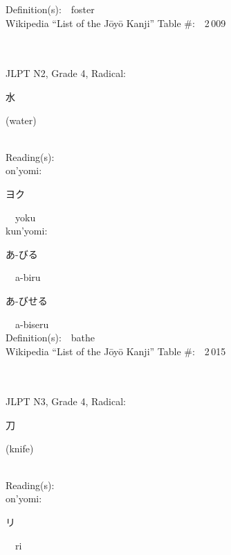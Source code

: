 \begin{multicols}{2}
Definition(s):\ \ foster \\
Wikipedia ``List of the J\=oy\=o Kanji'' Table \#:\ \ 2\,009 \\
\ \ \\
{\fontsize{34pt}{40pt}  }\ \ \\  %
{JLPT N2, Grade 4, Radical:\ \ {\begin{CJK}{UTF8}{min} 水 \end{CJK}} (water) } \\
Reading(s):\ \ \\
{\hspace*{1em}}on'yomi:\ \ \\
{\hspace*{2em}}{\begin{CJK}{UTF8}{min} ヨク \end{CJK}}\ \ yoku\ \ \\
{\hspace*{1em}}kun'yomi:\ \ \\
{\hspace*{2em}}{\begin{CJK}{UTF8}{min} あ-びる \end{CJK}}\ \ a-biru\ \ \\
{\hspace*{2em}}{\begin{CJK}{UTF8}{min} あ-びせる \end{CJK}}\ \ a-biseru\ \ \\
Definition(s):\ \ bathe \\
Wikipedia ``List of the J\=oy\=o Kanji'' Table \#:\ \ 2\,015 \\
\ \ \\
{\fontsize{34pt}{40pt}  }\ \ \\  %
{JLPT N3, Grade 4, Radical:\ \ {\begin{CJK}{UTF8}{min} 刀 \end{CJK}} (knife) } \\
Reading(s):\ \ \\
{\hspace*{1em}}on'yomi:\ \ \\
{\hspace*{2em}}{\begin{CJK}{UTF8}{min} リ \end{CJK}}\ \ ri\ \ \\

\end{multicols}
